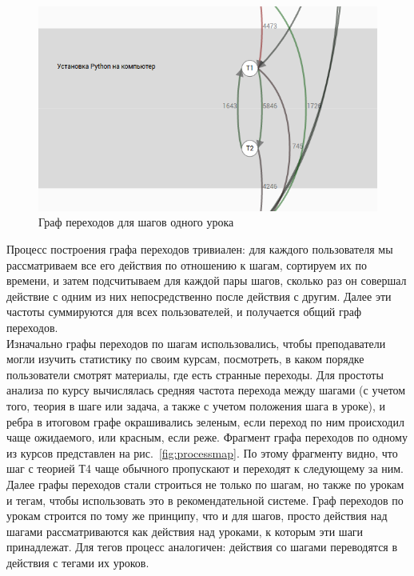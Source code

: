 \documentclass[14pt]{matmex-diploma}
\begin{document}
\begin{figure}[t]
\centering
\includegraphics[width=0.65\linewidth]{images/process_map_example.png}
\caption{Граф переходов для шагов одного урока}
\label{fig:process_map_example}
\end{figure}

\indent Процесс построения графа переходов тривиален: для каждого пользователя мы рассматриваем все его действия по отношению к шагам, сортируем их по времени, и затем подсчитываем для каждой пары шагов, сколько раз он совершал действие с одним из них непосредственно после действия с другим. Далее эти частоты суммируются для всех пользователей, и получается общий граф переходов.
\\\indent Изначально графы переходов по шагам использовались, чтобы преподаватели могли изучить статистику по своим курсам, посмотреть, в каком порядке пользователи смотрят материалы, где есть странные переходы. Для простоты анализа по курсу вычислялась средняя частота перехода между шагами (с учетом того, теория в шаге или задача, а также с учетом положения шага в уроке), и ребра в итоговом графе окрашивались зеленым, если переход по ним происходил чаще ожидаемого, или красным, если реже. Фрагмент графа переходов по одному из курсов представлен на рис.~\ref{fig:processmap}. По этому фрагменту видно, что шаг с теорией Т4 чаще обычного пропускают и переходят к следующему за ним.
\\\indent Далее графы переходов стали строиться не только по шагам, но также по урокам и тегам, чтобы использовать это в рекомендательной системе. Граф переходов по урокам строится по тому же принципу, что и для шагов, просто действия над шагами рассматриваются как действия над уроками, к которым эти шаги принадлежат. Для тегов процесс аналогичен: действия со шагами переводятся в действия с тегами их уроков.
\end{document}
